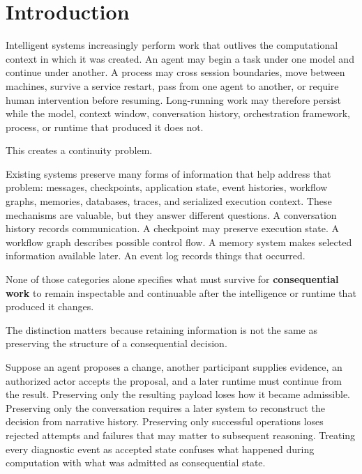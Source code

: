 \documentclass[11pt]{article}
\begin{document}
\begin{abstract}
These results do not establish that EASTER is minimal or universally sufficient. They motivate a narrower falsifiable hypothesis: \textbf{Evidence, Authority, State, Transition, Exception, and Receipt may be sufficient macroscopic variables for preserving consequential intelligent work across microscopic computational change.} We identify heterogeneous-runtime continuation without access to the originating runtime's private state as the direct experimental test of that hypothesis and define a prospective continuation oracle for that test.
\end{abstract}
\section{Introduction}

Intelligent systems increasingly perform work that outlives the computational context in which it was created. An agent may begin a task under one model and continue under another. A process may cross session boundaries, move between machines, survive a service restart, pass from one agent to another, or require human intervention before resuming. Long-running work may therefore persist while the model, context window, conversation history, orchestration framework, process, or runtime that produced it does not.

This creates a continuity problem.

Existing systems preserve many forms of information that help address that problem: messages, checkpoints, application state, event histories, workflow graphs, memories, databases, traces, and serialized execution context. These mechanisms are valuable, but they answer different questions. A conversation history records communication. A checkpoint may preserve execution state. A workflow graph describes possible control flow. A memory system makes selected information available later. An event log records things that occurred.

None of those categories alone specifies what must survive for \textbf{consequential work} to remain inspectable and continuable after the intelligence or runtime that produced it changes.

The distinction matters because retaining information is not the same as preserving the structure of a consequential decision.

Suppose an agent proposes a change, another participant supplies evidence, an authorized actor accepts the proposal, and a later runtime must continue from the result. Preserving only the resulting payload loses how it became admissible. Preserving only the conversation requires a later system to reconstruct the decision from narrative history. Preserving only successful operations loses rejected attempts and failures that may matter to subsequent reasoning. Treating every diagnostic event as accepted state confuses what happened during computation with what was admitted as consequential state.
\end{document}
